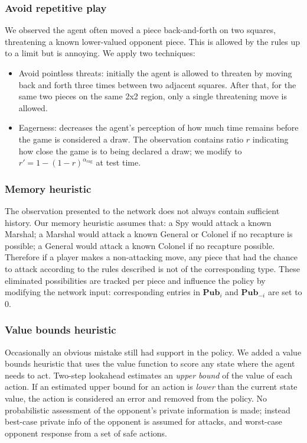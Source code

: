 \subsubsection{Avoid repetitive play}
We observed the agent often moved a piece back-and-forth on two squares, threatening a known lower-valued opponent piece. This is allowed by the rules up to a limit but is annoying. We apply two techniques:
\begin{itemize}
\item Avoid pointless threats: initially the agent is allowed to threaten by moving back and forth three times between two adjacent squares. After that, for the same two pieces on the same 2x2 region, only a single threatening move is allowed.
\item Eagerness: decreases the agent's perception of how much time remains before the game is considered a draw. The observation contains ratio $r$ indicating how close the game is to being declared a draw; we modify to $r' = 1 - (1 - r)^{\alpha_\text{eag}}$ at test time.
\end{itemize}

\subsubsection{Memory heuristic}
The observation presented to the network does not always contain sufficient history. Our memory heuristic assumes that: a Spy would attack a known Marshal; a Marshal would attack a known General or Colonel if no recapture is possible; a General would attack a known Colonel if no recapture possible. Therefore if a player makes a non-attacking move, any piece that had the chance to attack according to the rules described is not of the corresponding type. These eliminated possibilities are tracked per piece and influence the policy by modifying the network input: corresponding entries in $\textbf{Pub}_i$ and $\textbf{Pub}_{-i}$ are set to 0.

\subsubsection{Value bounds heuristic}
Occasionally an obvious mistake still had support in the policy. We added a value bounds heuristic that uses the value function to score any state where the agent needs to act. Two-step lookahead estimates an \emph{upper bound} of the value of each action. If an estimated upper bound for an action is \emph{lower} than the current state value, the action is considered an error and removed from the policy. No probabilistic assessment of the opponent's private information is made; instead best-case private info of the opponent is assumed for attacks, and worst-case opponent response from a set of safe actions.

